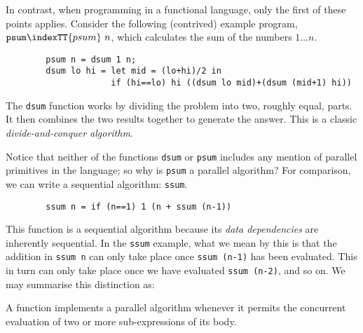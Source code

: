 In contrast, when programming in a functional language, only the first
of these points applies. Consider the following (contrived) example
program, $\mbox{\tt psum}\indexTT{psum}~n$, which calculates the sum of the numbers $1\ldots n$.
\begin{verbatim}
        psum n = dsum 1 n;
        dsum lo hi = let mid = (lo+hi)/2 in
                     if (hi==lo) hi ((dsum lo mid)+(dsum (mid+1) hi))
\end{verbatim}
The \mbox{\tt dsum} function works by dividing the problem into two, roughly
equal, parts. It then combines the two results together to generate
the answer.  This is a classic {\em divide-and-conquer
algorithm}.

Notice that neither of the functions \mbox{\tt dsum} or \mbox{\tt psum} includes any
mention of parallel primitives in the language; so why is \mbox{\tt psum} a
parallel algorithm? For comparison, we can write a sequential
algorithm: \mbox{\tt ssum}.
\begin{verbatim}
        ssum n = if (n==1) 1 (n + ssum (n-1))
\end{verbatim}
This function is a sequential algorithm because its {\em data
dependencies\/} are inherently
sequential. In the \mbox{\tt ssum} example, what
we mean by this is that the addition in \mbox{\tt ssum\ n} can only take place
once \mbox{\tt ssum\ (n-1)} has been evaluated.  This in turn can only take
place once we have evaluated \mbox{\tt ssum\ (n-2)}, and so on. We may summarise
this distinction as:
\begin{important}
A function implements a parallel algorithm whenever it permits the
concurrent evaluation of two or more sub-expressions of its body.
\end{important}

